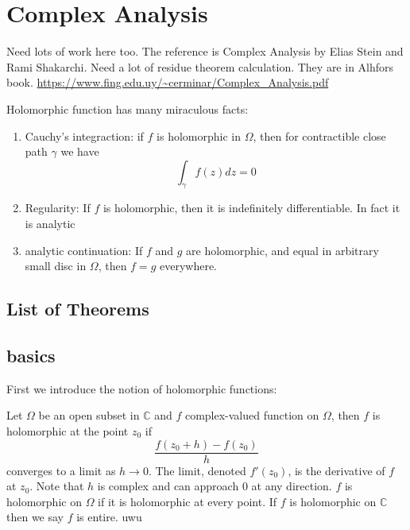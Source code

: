 \documentclass[main.tex]{subfiles}
\begin{document}
\section{Complex Analysis}
Need lots of work here too.
The reference is Complex Analysis by Elias Stein and Rami Shakarchi. Need a lot of residue theorem calculation. They are in Alhfors book. \url{https://www.fing.edu.uy/~cerminar/Complex_Analysis.pdf}

Holomorphic function has many miraculous facts:
\begin{enumerate}
    \item Cauchy's integraction: if $f$ is holomorphic in $\Omega$, then for contractible close path $\gamma$ we have 
    $$
    \int_\gamma f(z) dz = 0
    $$
    \item Regularity: If $f$ is holomorphic, then it is indefinitely differentiable. In fact it is analytic
    \item analytic continuation: If $f$ and $g$ are holomorphic, and equal in arbitrary small disc in $\Omega$, then $f = g$ everywhere.
\end{enumerate}

\subsection{List of Theorems}

\subsection{basics}

First we introduce the notion of holomorphic functions:

\begin{definition}
Let $\Omega$ be an open subset in $\mathbb{C}$ and $f$ complex-valued function on $\Omega$, then $f$ is holomorphic at the point $z_0$ if 
$$
\frac{f(z_0 + h) - f(z_0)}{h}
$$
converges to a limit as $h \rightarrow 0$. The limit, denoted $f'(z_0)$, is the derivative of $f$ at $z_0$. Note that $h$ is complex and can approach $0$ at any direction. $f$ is holomorphic on $\Omega$ if it is holomorphic at every point. If $f$ is holomorphic on $\mathbb{C}$ then we say $f$ is entire. uwu
\end{definition}
\end{document}
